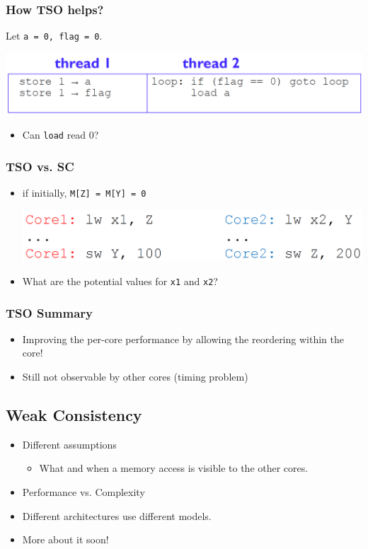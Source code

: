 \documentclass[10pt]{article}
\begin{document}
\subsubsection*{How TSO helps?}
Let \texttt{a = 0, flag = 0}.
\begin{center}
    \includegraphics*[scale=0.4]{W9_3.png}
\end{center}
\begin{itemize}
    \item Can \texttt{load} read 0?
\end{itemize}
\subsubsection*{TSO vs. SC}
\begin{itemize}
    \item if initially, \texttt{M[Z] = M[Y] = 0}
    \begin{center}
        \includegraphics*[scale=0.3]{W9_4.png}
    \end{center}
    \item What are the potential values for \texttt{x1} and \texttt{x2}?
\end{itemize}
\subsubsection*{TSO Summary}
\begin{itemize}
    \item Improving the per-core performance by allowing the reordering within the core!
    \item Still not observable by other cores (timing problem)
\end{itemize}

\subsection*{Weak Consistency}
\begin{itemize}
    \item Different assumptions
    \begin{itemize}
        \item What and when a memory access is visible to the other cores.
    \end{itemize}
    \item Performance vs. Complexity
    \item Different architectures use different models.
    \item More about it soon!
\end{itemize}
\end{document}
